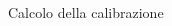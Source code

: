 \documentclass [xcolor=svgnames] {beamer}
\begin{document}
\begin{frame}{Calcolo della calibrazione}
	\begin{columns}%
		\begin{column}{0.4\textwidth}%
		\end{column}
		\begin{column}{0.5\textwidth}
			\begin{figure}
				\centering
			\end{figure}
		\end{column}
	\end{columns}
\end{frame}
\end{document}

